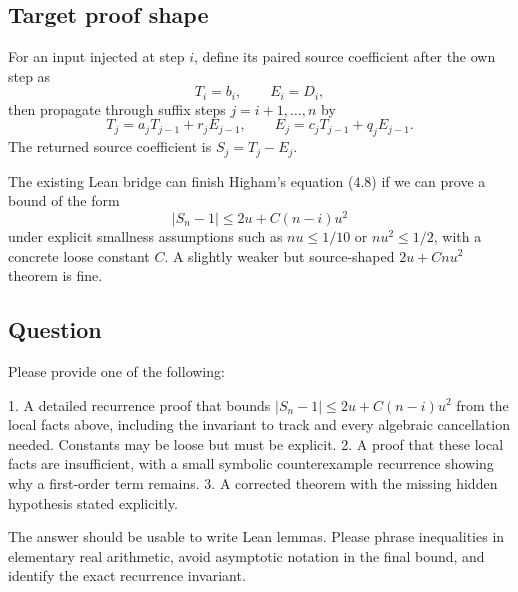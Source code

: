 \documentclass{article}
\begin{document}
\subsection*{Target proof shape}

For an input injected at step \(i\), define its paired source coefficient after
the own step as
\[
  T_i=b_i,\qquad E_i=D_i,
\]
then propagate through suffix steps \(j=i+1,\dots,n\) by
\[
  T_{j}=a_jT_{j-1}+r_jE_{j-1},\qquad
  E_j=c_jT_{j-1}+q_jE_{j-1}.
\]
The returned source coefficient is \(S_j=T_j-E_j\).

The existing Lean bridge can finish Higham's equation (4.8) if we can prove a
bound of the form
\[
  |S_n-1| \le 2u + C(n-i)u^2
\]
under explicit smallness assumptions such as \(nu\le 1/10\) or \(nu^2\le 1/2\),
with a concrete loose constant \(C\).  A slightly weaker but source-shaped
\(2u+Cnu^2\) theorem is fine.

\subsection*{Question}

Please provide one of the following:

1. A detailed recurrence proof that bounds \( |S_n-1| \le 2u+C(n-i)u^2 \)
   from the local facts above, including the invariant to track and every
   algebraic cancellation needed.  Constants may be loose but must be explicit.
2. A proof that these local facts are insufficient, with a small symbolic
   counterexample recurrence showing why a first-order term remains.
3. A corrected theorem with the missing hidden hypothesis stated explicitly.

The answer should be usable to write Lean lemmas.  Please phrase inequalities
in elementary real arithmetic, avoid asymptotic notation in the final bound,
and identify the exact recurrence invariant.
\end{document}
